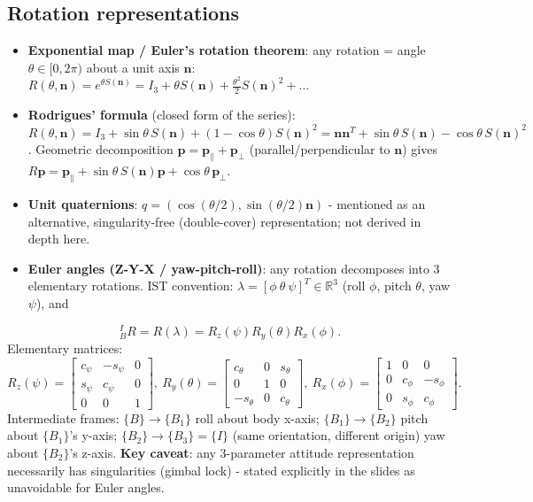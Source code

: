 \documentclass[11pt]{article}
\begin{document}
\subsection{Rotation representations}
\begin{itemize}
\item \textbf{Exponential map / Euler's rotation theorem}: any rotation = angle $\theta\in[0,2\pi)$ about a unit axis $\mathbf n$: $R(\theta,\mathbf n)=e^{\theta S(\mathbf n)}=I_3+\theta S(\mathbf n)+\tfrac{\theta^2}{2}S(\mathbf n)^2+\dots$
\item \textbf{Rodrigues' formula} (closed form of the series): $R(\theta,\mathbf n)=I_3+\sin\theta\,S(\mathbf n)+(1-\cos\theta)S(\mathbf n)^2 = \mathbf n\mathbf n^T+\sin\theta\,S(\mathbf n)-\cos\theta\,S(\mathbf n)^2$.
Geometric decomposition $\mathbf p=\mathbf p_\parallel+\mathbf p_\perp$ (parallel/perpendicular to $\mathbf n$) gives $R\mathbf p=\mathbf p_\parallel+\sin\theta\,S(\mathbf n)\mathbf p+\cos\theta\,\mathbf p_\perp$.
\item \textbf{Unit quaternions}: $q=(\cos(\theta/2),\sin(\theta/2)\mathbf n)$ - mentioned as an alternative, singularity-free (double-cover) representation; not derived in depth here.
\item \textbf{Euler angles (Z-Y-X / yaw-pitch-roll)}: any rotation decomposes into 3 elementary rotations. IST convention: $\lambda=[\phi\ \theta\ \psi]^T\in\mathbb{R}^3$ (roll $\phi$, pitch $\theta$, yaw $\psi$), and
\end{itemize}
\[{}^I_BR=R(\lambda)=R_z(\psi)R_y(\theta)R_x(\phi).\]
Elementary matrices:
\[R_z(\psi)=\begin{bmatrix}c_\psi&-s_\psi&0\\s_\psi&c_\psi&0\\0&0&1\end{bmatrix},\ R_y(\theta)=\begin{bmatrix}c_\theta&0&s_\theta\\0&1&0\\-s_\theta&0&c_\theta\end{bmatrix},\ R_x(\phi)=\begin{bmatrix}1&0&0\\0&c_\phi&-s_\phi\\0&s_\phi&c_\phi\end{bmatrix}.\]
Intermediate frames: $\{B\}\to\{B_1\}$ roll about body x-axis; $\{B_1\}\to\{B_2\}$ pitch about $\{B_1\}$'s y-axis; $\{B_2\}\to\{B_3\}=\{I\}$ (same orientation, different origin) yaw about $\{B_2\}$'s z-axis.
\textbf{Key caveat}: any 3-parameter attitude representation necessarily has singularities (gimbal lock) - stated explicitly in the slides as unavoidable for Euler angles.
\end{document}
